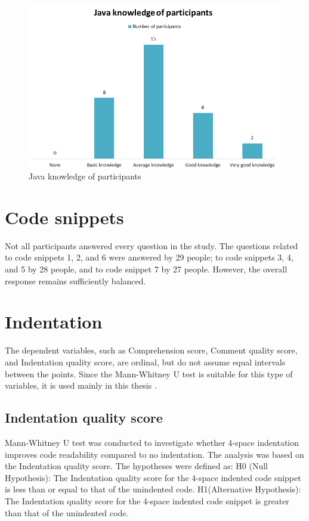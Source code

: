 \begin{figure} [H]
  \centering
  \includegraphics[scale=1]{figures/java_kn.png}
  \caption{Java knowledge of participants}
  \label{fig:AnhangsChor}
\end{figure}


\section{Code snippets}
Not all participants answered every question in the study. The questions related to code snippets 1, 2, and 6 were answered by 29 people;  to code snippets 3, 4, and 5 by 28 people, and to code snippet 7 by 27 people.  However, the overall response remains sufficiently balanced.

\section{Indentation}

The dependent variables, such as Comprehension score, Comment quality score, and Indentation quality score, are ordinal, but do not assume equal intervals between the points.
Since the Mann-Whitney U test is suitable for this type of variables, it is used mainly in this thesis \cite{MacFarland2016}.

\subsection{Indentation quality score}


Mann-Whitney U test was conducted to investigate whether 4-space indentation improves code readability compared to no indentation. The analysis was based on the Indentation quality score. The hypotheses were defined as:  H0 (Null Hypothesis): The Indentation quality score for the 4-space indented code snippet is less than or equal to that of the unindented code. H1(Alternative Hypothesis): The Indentation quality score for the 4-space indented code snippet is greater than that of the unindented code.

